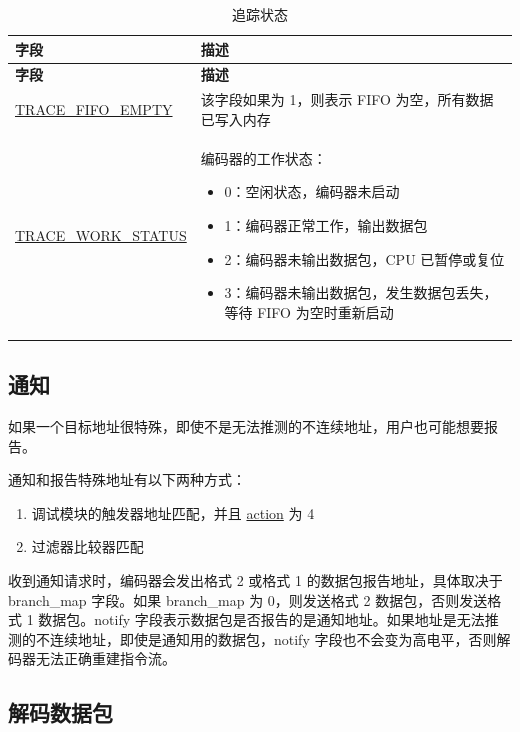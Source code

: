\documentclass[main\_\_CN.tex]{subfiles}
\begin{document}
\begin{longtable}[c]{ |l|L{10cm}| }
    \caption{追踪状态}
    \label{riscvtracenc-trace-status}
    \\\hline{}
    \textbf{字段} & \textbf{描述} \\\hline
    \endfirsthead

    \textbf{字段} & \textbf{描述} \\\hline
    \endhead
    \endfoot
    \endlastfoot

    \hyperref[fielddesc:TRACEFIFOEMPTY]{TRACE\_FIFO\_EMPTY} & 该字段如果为 1，则表示 FIFO 为空，所有数据已写入内存 \\\hline
    \hyperref[fielddesc:TRACEWORKSTATUS]{TRACE\_WORK\_STATUS} & 编码器的工作状态：
    \begin{itemize}
        \item 0：空闲状态，编码器未启动
        \item 1：编码器正常工作，输出数据包
        \item 2：编码器未输出数据包，CPU 已暂停或复位
        \item 3：编码器未输出数据包，发生数据包丢失，等待 FIFO 为空时重新启动
    \end{itemize}
    \\\hline

\end{longtable}

\subsection{通知}\label{subsec:notify}

如果一个目标地址很特殊，即使不是无法推测的不连续地址，用户也可能想要报告。

通知和报告特殊地址有以下两种方式：
\begin{enumerate}
    \item 调试模块的触发器地址匹配，并且 \hyperref[fielddesc:MCONTROLACTION]{action} 为 4
    \item 过滤器比较器匹配
\end{enumerate}

收到通知请求时，编码器会发出格式 2 或格式 1 的数据包报告地址，具体取决于 branch\_map 字段。如果 branch\_map 为 0，则发送格式 2 数据包，否则发送格式 1 数据包。notify 字段表示数据包是否报告的是通知地址。如果地址是无法推测的不连续地址，即使是通知用的数据包，notify 字段也不会变为高电平，否则解码器无法正确重建指令流。

\subsection{解码数据包}
\end{document}
